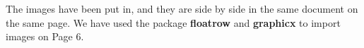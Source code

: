 \documentclass[a4paper, 12pt, fullpage]{article}
\begin{document}
\begin{figure}[H]
\begin{floatrow}
	\hspace{-0.4cm}
\end{floatrow}
\end{figure}

The images have been put in, and they are side by side in the same document on the same page. We have used the package \textbf{floatrow} and \textbf{graphicx} to import images on Page 6.
\end{document}
